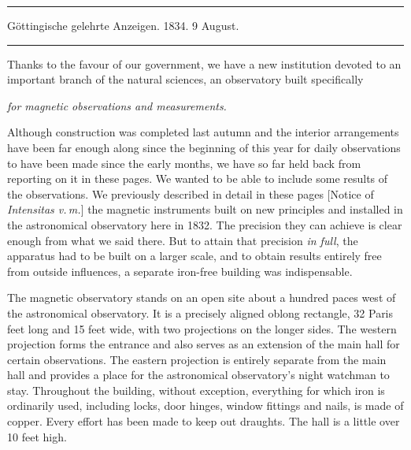 \begin{center}
\hrule\vspace{2mm}
Göttingische gelehrte Anzeigen. 1834. 9 August.
\vspace{2mm}\hrule\vspace{5mm}
\end{center}
Thanks to the favour of our government, we have a new institution devoted to an important branch of the natural sciences, an observatory built specifically
\begin{center}\itshape for magnetic observations and measurements\normalfont.\end{center}

Although construction was completed last autumn and the interior arrangements have been far enough along since the beginning of this year for daily observations to have been made since the early months, we have so far held back from reporting on it in these pages. We wanted to be able to include some results of the observations. We previously described in detail in these pages [Notice of \textit{Intensitas v.\,m.}] the magnetic instruments built on new principles and installed in the astronomical observatory here in 1832. The precision they can
achieve is clear enough from what we said there. But to attain that precision \textit{in full}, the apparatus had to be built on a larger scale, and to obtain results entirely free from outside influences, a separate iron-free building was indispensable.

The magnetic observatory stands on an open site about a hundred paces west of the astronomical observatory. It is a precisely aligned oblong rectangle, 32 Paris feet long and 15 feet wide, with two projections on the longer sides. The western projection forms the entrance and also serves as an extension of the main hall for certain observations. The eastern projection is entirely separate from the main hall and provides a place for the astronomical observatory’s night watchman to stay. Throughout the building, without exception, everything for which iron is ordinarily used, including locks, door hinges, window fittings and nails, is made of copper. Every effort has been made to keep out draughts. The hall is a little over 10 feet high.

